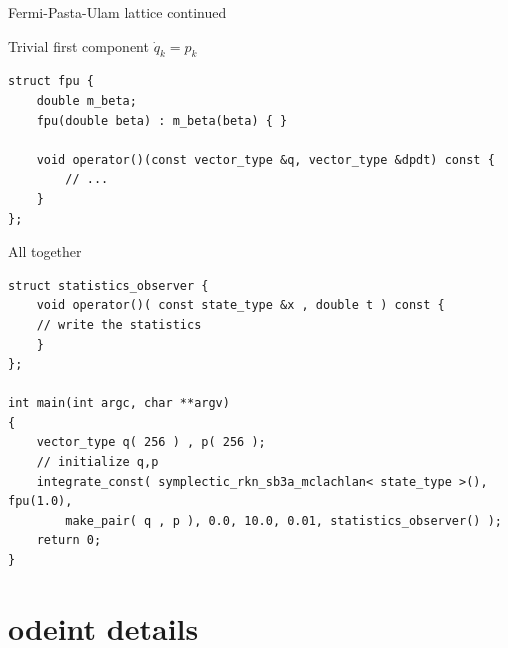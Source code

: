\documentclass{beamer}
\begin{document}
\begin{frame}[fragile]{Fermi-Pasta-Ulam lattice continued}

  Trivial first component $\dot{q}_k = p_k$

  \begin{lstlisting}
struct fpu {
    double m_beta;
    fpu(double beta) : m_beta(beta) { }

    void operator()(const vector_type &q, vector_type &dpdt) const {
        // ...
    }
};
  \end{lstlisting}

  \pause

  \vspace{2ex}

  All together

  \begin{lstlisting}
struct statistics_observer {
    void operator()( const state_type &x , double t ) const { 
    // write the statistics
    }
};

int main(int argc, char **argv)
{
    vector_type q( 256 ) , p( 256 );
    // initialize q,p
    integrate_const( symplectic_rkn_sb3a_mclachlan< state_type >(), fpu(1.0),
        make_pair( q , p ), 0.0, 10.0, 0.01, statistics_observer() );
    return 0;
}
  \end{lstlisting}



\end{frame}



\section{odeint details}

\frame{\tableofcontents[currentsection]}


\end{document}
